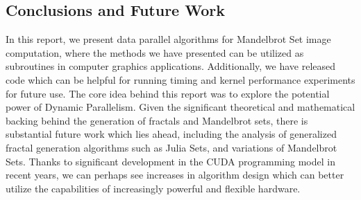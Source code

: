 \documentclass[letterpaper]{article}
\begin{document}
\begin{multicols}{2}
  \section{Conclusions and Future Work}

In this report, we present data parallel algorithms for Mandelbrot Set image
  computation, where the methods we have presented can be utilized as
  subroutines in computer graphics applications. Additionally, we have released
  code which can be helpful for running timing and kernel performance
  experiments for future use. The core idea behind this report was to explore
  the potential power of Dynamic Parallelism. 
Given the significant theoretical and mathematical backing behind the generation 
  of fractals and Mandelbrot sets, there is substantial future work which lies 
  ahead, including the analysis of generalized fractal generation algorithms
  such as Julia Sets, and variations of Mandelbrot Sets. 
Thanks to significant development in the CUDA programming model in recent years,
  we can perhaps see increases in algorithm design which can better utilize the
  capabilities of increasingly powerful and flexible hardware. 

\end{multicols}
\end{document}
